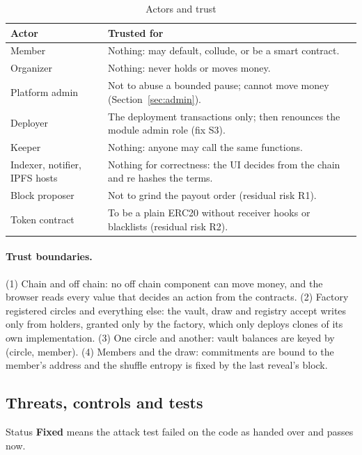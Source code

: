 \begin{table}[H]
\centering\small
\caption{Actors and trust}
\label{tab:actors}
\begin{tabularx}{\textwidth}{@{}P{3.3cm}L@{}}
\toprule
Actor & Trusted for \\
\midrule
Member & Nothing: may default, collude, or be a smart contract. \\
Organizer & Nothing: never holds or moves money. \\
Platform admin & Not to abuse a bounded pause; cannot move money (Section~\ref{sec:admin}). \\
Deployer & The deployment transactions only; then renounces the module admin role (fix S3). \\
Keeper & Nothing: anyone may call the same functions. \\
Indexer, notifier, IPFS hosts & Nothing for correctness: the UI decides from the chain and re hashes the terms. \\
Block proposer & Not to grind the payout order (residual risk R1). \\
Token contract & To be a plain ERC20 without receiver hooks or blacklists (residual risk R2). \\
\bottomrule
\end{tabularx}
\end{table}

\paragraph{Trust boundaries.} (1) Chain and off chain: no off chain component can move money, and the
browser reads every value that decides an action from the contracts. (2) Factory registered circles and
everything else: the vault, draw and registry accept writes only from  holders,
granted only by the factory, which only deploys clones of its own implementation. (3) One circle and
another: vault balances are keyed by (circle, member). (4) Members and the draw: commitments are bound
to the member's address and the shuffle entropy is fixed by the last reveal's block.

\subsection{Threats, controls and tests}
Status \textbf{Fixed} means the attack test failed on the code as handed over and passes now.

